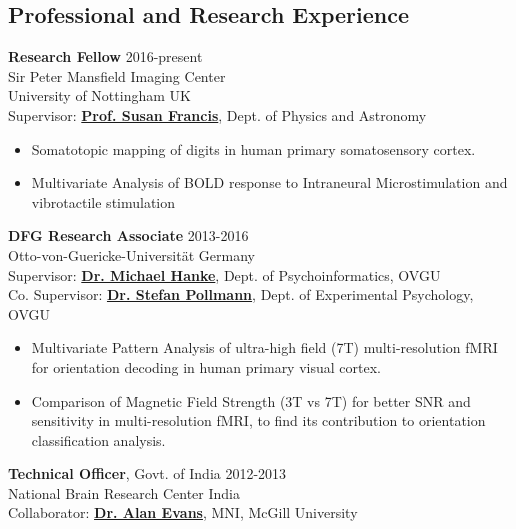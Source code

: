 \documentclass[line, margin]{res}
\begin{document}
\begin{resume}
\section{Professional and Research Experience}

\textbf{Research Fellow} \hfill 2016-present\\
Sir Peter Mansfield Imaging Center\\
University of Nottingham \hfill UK\\
Supervisor: \href{https://www.nottingham.ac.uk/physics/people/susan.francis}{\textbf{Prof. Susan Francis}}, Dept. of Physics and Astronomy\\

\begin{itemize}
    \item Somatotopic mapping of digits in human primary somatosensory cortex. 
    \item Multivariate Analysis of BOLD response to Intraneural Microstimulation and vibrotactile stimulation
\end{itemize}
\newpage
\textbf{DFG Research Associate} \hfill 2013-2016\\
Otto-von-Guericke-Universit\"{a}t \hfill Germany\\
Supervisor: \href{http://mih.voxindeserto.de/}{\textbf{Dr. Michael Hanke}}, Dept. of Psychoinformatics, OVGU\\
Co. Supervisor: \href{http://www.ipsy.ovgu.de/ipsy/en/Departments/Experimental+Psychology/People.html}{\textbf{Dr. Stefan Pollmann}}, Dept. of Experimental Psychology, OVGU

\begin{itemize}
    \item Multivariate Pattern Analysis of ultra-high field (7T) multi-resolution fMRI for orientation decoding in human primary visual cortex. 
    \item Comparison of Magnetic Field Strength (3T vs 7T) for better SNR and sensitivity in multi-resolution fMRI, to find its contribution to orientation classification analysis.
\end{itemize}


\textbf{Technical Officer}, Govt. of India \hfill 2012-2013\\
National Brain Research Center \hfill India\\
Collaborator: \href{http://mcin-cnim.ca/people/alans-cv/}{\textbf{Dr. Alan Evans}}, MNI, McGill University 
\begin{itemize}


\end{itemize}
\end{resume}
\end{document}
